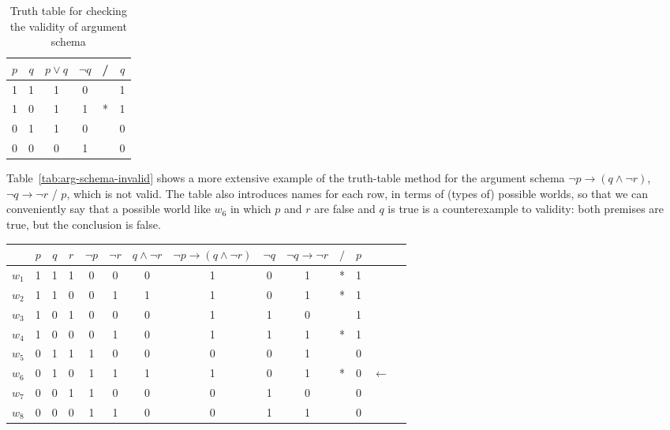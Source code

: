 \documentclass[nobib,nofonts]{tufte-handout}
\begin{document}
\begin{table}
  \centering
  \begin{tabular}{cccccc}
    $p$ & $q$ & $p \vee q$ & $\neg q$ & / & $q$ \\ \midrule
    1  & 1 & 1 & 0 &   & 1  \\
    1  & 0 & 1 & 1 & * & 1  \\
    0  & 1 & 1 & 0 &   & 0  \\
    0  & 0 & 0 & 1 &   & 0  \\
  \end{tabular}
  \caption{Truth table for checking the validity of argument schema}
  \label{tab:truth-table-valid}
\end{table}

Table~\ref{tab:arg-schema-invalid} shows a more extensive example of the truth-table method for the argument schema  $\neg p \rightarrow (q \wedge \neg r)$, $\neg q \rightarrow \neg r$ / $p$, which is not valid.
The table also introduces names for each row, in terms of (types of) possible worlds, so that we can conveniently say that a possible world like $w_{6}$ in which $p$ and $r$ are false and $q$ is true is a counterexample to validity: both premises are true, but the conclusion is false.

\begin{table*}
  \centering
  \begin{tabular}{ccccccc>{\columncolor{olive!15}}cc>{\columncolor{olive!15}}cc>{\columncolor{olive!15}}ccl}
    & $p$ & $q$ & $r$ & $\neg p$ & $\neg r$ & $q \wedge \neg r$
    & $\neg p \rightarrow (q \wedge \neg r)$ & $\neg q$
    & $\neg q \rightarrow \neg r$ & $/$ & $p$ & \\ \midrule
    $w_{1}$ & 1  & 1 & 1 & 0 & 0 & 0 & 1 & 0 & 1 & * & 1  & \\
    $w_{2}$ & 1  & 1 & 0 & 0 & 1 & 1 & 1 & 0 & 1 & * & 1  & \\
    $w_{3}$ & 1  & 0 & 1 & 0 & 0 & 0 & 1 & 1 & 0 &   & 1  & \\
    $w_{4}$ & 1  & 0 & 0 & 0 & 1 & 0 & 1 & 1 & 1 & * & 1  & \\
    $w_{5}$ & 0  & 1 & 1 & 1 & 0 & 0 & 0 & 0 & 1 &   & 0  & \\
    $w_{6}$ & 0  & 1 & 0 & 1 & 1 & 1 & 1 & 0 & 1 & * & 0  & $\leftarrow$\\
    $w_{7}$ & 0  & 0 & 1 & 1 & 0 & 0 & 0 & 1 & 0 &   & 0  & \\
    $w_{8}$ & 0  & 0 & 0 & 1 & 1 & 0 & 0 & 1 & 1 &   & 0  & \\
  \end{tabular}
  \caption{Example of the truth-table method applied to an argument schema that is not valid}
  \label{tab:arg-schema-invalid}
\end{table*}
\end{document}
